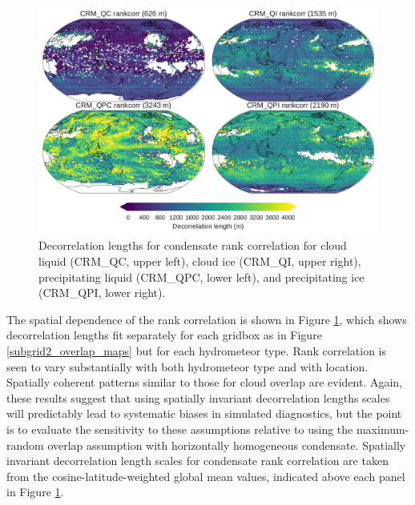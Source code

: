 \begin{figure}
\centering
\includegraphics[width=\columnwidth]{graphics/subgrid2_rankcorr_maps.pdf}
\caption{Decorrelation lengths for condensate rank correlation for cloud liquid (CRM\_QC, upper left), cloud ice (CRM\_QI, upper right), precipitating liquid (CRM\_QPC, lower left), and precipitating ice (CRM\_QPI, lower right).}
\label{subgrid2_rankcorr_maps}
\end{figure}

The spatial dependence of the rank correlation is shown in Figure \ref{subgrid2_rankcorr_maps}, which shows decorrelation lengths fit separately for each gridbox as in Figure \ref{subgrid2_overlap_maps} but for each hydrometeor type. Rank correlation is seen to vary substantially with both hydrometeor type and with location. Spatially coherent patterns similar to those for cloud overlap are evident. Again, these results suggest that using spatially invariant decorrelation lengths scales will predictably lead to systematic biases in simulated diagnostics, but the point is to evaluate the sensitivity to these assumptions relative to using the maximum-random overlap assumption with horizontally homogeneous condensate. Spatially invariant decorrelation length scales for condensate rank correlation are taken from the cosine-latitude-weighted global mean values, indicated above each panel in Figure \ref{subgrid2_rankcorr_maps}.

